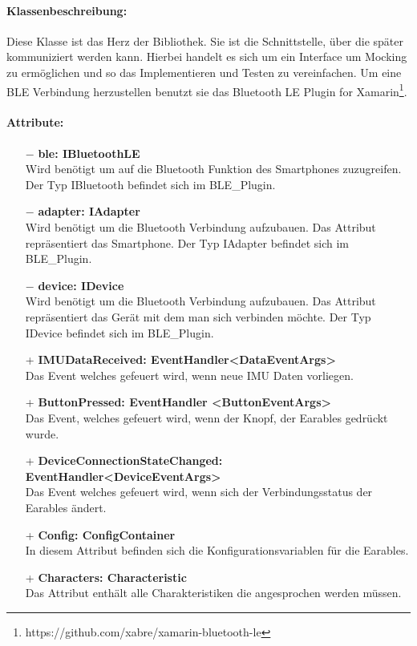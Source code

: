 \documentclass[a4paper,12pt]{article}
\begin{document}
\paragraph{Klassenbeschreibung:}
Diese Klasse ist das Herz der Bibliothek. Sie ist die Schnittstelle, über die später kommuniziert werden kann. Hierbei handelt es sich um ein Interface um Mocking zu ermöglichen und so das Implementieren und Testen zu vereinfachen. Um eine BLE Verbindung herzustellen benutzt sie das \glqq Bluetooth LE Plugin for Xamarin\grqq{}\footnote{https://github.com/xabre/xamarin-bluetooth-le}.
\paragraph{Attribute:}
\begin{itemize}
	\item[$-$] \textbf{ble: IBluetoothLE}\\ Wird benötigt um auf die Bluetooth Funktion des Smartphones zuzugreifen. Der Typ IBluetooth befindet sich im BLE\_Plugin.
	\item[$-$] \textbf{adapter: IAdapter}\\ Wird benötigt um die Bluetooth Verbindung aufzubauen. Das Attribut repräsentiert das Smartphone. Der Typ  IAdapter befindet sich im BLE\_Plugin.
	\item[$-$] \textbf{device: IDevice}\\ Wird benötigt um die Bluetooth Verbindung aufzubauen. Das Attribut repräsentiert das Gerät mit dem man sich verbinden möchte. Der Typ  IDevice befindet sich im BLE\_Plugin.
	\item[+] \textbf{IMUDataReceived: EventHandler<DataEventArgs>}\\ Das Event welches gefeuert wird, wenn neue IMU Daten vorliegen.
	\item[+] \textbf{ButtonPressed: EventHandler <ButtonEventArgs>}\\ Das Event, welches gefeuert wird, wenn der Knopf, der Earables gedrückt wurde.
	\item[+] \textbf{DeviceConnectionStateChanged: EventHandler<DeviceEventArgs>}\\ Das Event welches gefeuert wird, wenn sich der Verbindungsstatus der Earables ändert.
	\item[+] \textbf{Config: ConfigContainer}\\ In diesem Attribut befinden sich die Konfigurationsvariablen für die \Gls{Earables}.
	\item[+] \textbf{Characters: Characteristic}\\ Das Attribut enthält alle Charakteristiken die angesprochen werden müssen.
\end{itemize}
\end{document}

